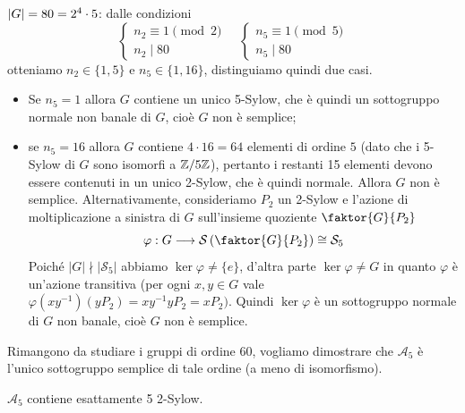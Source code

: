\documentclass[11pt]{scrartcl}
\begin{document}
	\underline{$\left\lvert G \right\rvert = 80 = 2^4\cdot 5$}: dalle condizioni
	\[
	\begin{cases}
		n_2 \equiv 1 \pmod 2\\
		n_2 \mid 80
	\end{cases}\quad
	\begin{cases}
		n_5 \equiv 1 \pmod 5\\
		n_5 \mid 80
	\end{cases}
	\]
	otteniamo $n_2 \in \{1, 5\}$ e $n_5 \in \{1, 16\}$, distinguiamo quindi due
	casi.
	\begin{itemize}
		\item Se $n_5 = 1$ allora $G$ contiene un unico 5-Sylow, che è quindi un
		sottogruppo normale non banale di $G$, cioè $G$ non è semplice;
		\item se $n_5 = 16$ allora $G$ contiene $4\cdot 16 = 64$ elementi di ordine
		$5$ (dato che i 5-Sylow di $G$ sono isomorfi a $\mathbb{Z}/{5}\mathbb{Z}$), pertanto i restanti
		15 elementi devono essere contenuti in un unico 2-Sylow, che è quindi normale.
		Allora $G$ non è semplice. \newline Alternativamente, consideriamo $P_2$ un 2-Sylow
		e l'azione di moltiplicazione a sinistra di $G$ sull'insieme quoziente $\faktor{G}{P_2}$
		\[
		\varphi: G\longrightarrow\mathcal{S}\left(\faktor{G}{P_2}\right) \cong \mathcal{S}_5
		\]
		Poiché $|G| \nmid |\mathcal{S}_5|$ abbiamo $\ker\varphi\neq\{e\}$, d'altra parte
		$\ker\varphi \neq G$ in quanto $\varphi$ è un'azione transitiva (per 
		ogni $x, y \in G$ vale $\varphi(xy^{-1})(yP_2) = xy^{-1}yP_2 = xP_2)$.
		Quindi $\ker\varphi$ è un sottogruppo normale di $G$ non banale, cioè $G$
		non è semplice. 
	\end{itemize}
	
	Rimangono da studiare i gruppi di ordine $60$, vogliamo dimostrare che 
	$\mathcal{A}_5$ è l'unico sottogruppo semplice di tale ordine (a meno di isomorfismo).
	
	\begin{lemma}
		$\mathcal{A}_5$ contiene esattamente 5 2-Sylow.
	\end{lemma}
	
\end{document}
